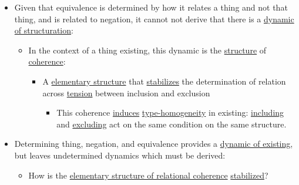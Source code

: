 \documentclass[11pt]{article}
\begin{document}
\begin{itemize}
\begin{itemize}
\item In the context of a thing existing, this dynamic is the \href{condition.org}{conditions} of \href{inclusion.org}{inclusion} and \href{exclusion.org}{exclusion}:
\begin{itemize}
\item Inclusion is the condition of existing as a thing.
\item Exclusion is the condition of not existing that thing.
\end{itemize}
\end{itemize}
\item Given that equivalence is determined by how it relates a thing and not that thing, and is related to negation, it cannot not derive that there is a \href{dynamic-of-structuration.org}{dynamic of structuration}:
\begin{itemize}
\item In the context of a thing existing, this dynamic is the \href{structure.org}{structure} of \href{coherence.org}{coherence}:
\begin{itemize}
\item A \href{elementary-structure.org}{elementary structure} that \href{stabilizing.org}{stabilizes} the determination of relation across \href{tension.org}{tension} between inclusion and exclusion
\begin{itemize}
\item This coherence \href{inducing.org}{induces} \href{type-homogeneity.org}{type-homogeneity} in existing: \href{including.org}{including} and \href{excluding.org}{excluding} act on the same condition on the same structure.
\end{itemize}
\end{itemize}
\end{itemize}
\item Determining thing, negation, and equivalence provides a \href{dynamic-of-existing.org}{dynamic of existing}, but leaves undetermined dynamics which must be derived:
\begin{itemize}
\item How is the \href{elementary-structure-of-relational-coherence.org}{elementary structure of relational coherence} \href{stabilizing.org}{stabilized}?
\end{itemize}
\end{itemize}
\end{document}
